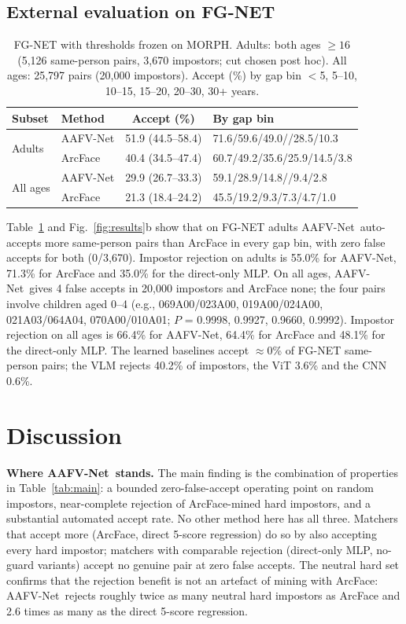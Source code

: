 \documentclass[10pt,twocolumn]{article}
\newcommand{\sys}{AAFV-Net}
\begin{document}
\subsection{External evaluation on FG-NET}
\begin{table}[t]
\centering\small
\caption{FG-NET with thresholds frozen on MORPH. Adults: both ages $\ge16$ (5{,}126 same-person pairs, 3{,}670 impostors; cut chosen post hoc). All ages: 25{,}797 pairs (20{,}000 impostors). Accept (\%) by gap bin $<$5, 5--10, 10--15, 15--20, 20--30, 30+ years.}
\label{tab:fg}
\setlength{\tabcolsep}{2pt}\small
\begin{tabular}{@{}llcl@{}}
\toprule
Subset & Method & Accept (\%) & By gap bin\\\midrule
\multirow{2}{*}{Adults} & \sys & 51.9 (44.5--58.4) & 71.6/59.6/49.0/\allowbreak38.2/28.5/10.3\\
 & ArcFace & 40.4 (34.5--47.4) & 60.7/49.2/35.6/25.9/14.5/3.8\\\midrule
\multirow{2}{*}{All ages} & \sys & 29.9 (26.7--33.3) & 59.1/28.9/14.8/\allowbreak11.7/9.4/2.8\\
 & ArcFace & 21.3 (18.4--24.2) & 45.5/19.2/9.3/7.3/4.7/1.0\\\bottomrule
\end{tabular}
\end{table}
Table~\ref{tab:fg} and Fig.~\ref{fig:results}b show that on FG-NET adults \sys\ auto-accepts more same-person pairs than ArcFace in every gap bin, with zero false accepts for both (0/3{,}670). Impostor rejection on adults is 55.0\% for \sys, 71.3\% for ArcFace and 35.0\% for the direct-only MLP. On all ages, \sys\ gives 4 false accepts in 20{,}000 impostors and ArcFace none; the four pairs involve children aged 0--4 (e.g., 069A00/023A00, 019A00/024A00, 021A03/064A04, 070A00/010A01; $P$ = 0.9998, 0.9927, 0.9660, 0.9992). Impostor rejection on all ages is 66.4\% for \sys, 64.4\% for ArcFace and 48.1\% for the direct-only MLP. The learned baselines accept $\approx$0\% of FG-NET same-person pairs; the VLM rejects 40.2\% of impostors, the ViT 3.6\% and the CNN 0.6\%.

\section{Discussion}
\textbf{Where \sys\ stands.} The main finding is the combination of properties in Table~\ref{tab:main}: a bounded zero-false-accept operating point on random impostors, near-complete rejection of ArcFace-mined hard impostors, and a substantial automated accept rate. No other method here has all three. Matchers that accept more (ArcFace, direct 5-score regression) do so by also accepting every hard impostor; matchers with comparable rejection (direct-only MLP, no-guard variants) accept no genuine pair at zero false accepts. The neutral hard set confirms that the rejection benefit is not an artefact of mining with ArcFace: \sys\ rejects roughly twice as many neutral hard impostors as ArcFace and 2.6 times as many as the direct 5-score regression.
\end{document}
